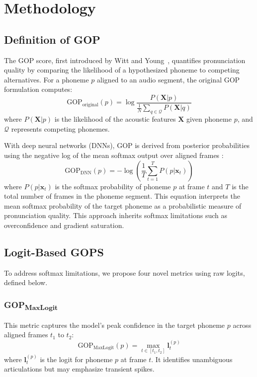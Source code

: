 \documentclass{Interspeech}
\begin{document}
\section{Methodology}
\subsection{Definition of GOP}

The GOP score, first introduced by Witt and Young~\cite{witt2000use}, quantifies pronunciation quality by comparing the likelihood of a hypothesized phoneme to competing alternatives. For a phoneme \( p \) aligned to an audio segment, the original GOP formulation computes:
\begin{equation}
    \text{GOP}_{\text{original}}(p) = \log \frac{P(\mathbf{X} | p)}{ \frac{1}{N} \sum_{q \in \mathcal{Q}} P(\mathbf{X} | q) }
    \label{eq:gop_original}
\end{equation}
where \( P(\mathbf{X} | p) \) is the likelihood of the acoustic features \( \mathbf{X} \) given phoneme \( p \), and \( \mathcal{Q} \) represents competing phonemes.

With deep neural networks (DNNs), GOP is derived from posterior probabilities using the negative log of the mean softmax output over aligned frames \cite{hu2013new}:
\begin{equation}
    \text{GOP}_{\text{DNN}}(p) = -\log \left( \frac{1}{T} \sum_{t=1}^T P(p | \mathbf{x}_t) \right)
    \label{eq:gop_dnn}
\end{equation}
where \( P(p | \mathbf{x}_t) \) is the softmax probability of phoneme \( p \) at frame \( t \) and $T$ is the total number of frames in the phoneme segment.  This equation interprets the mean softmax probability of the target phoneme as a probabilistic measure of pronunciation quality. This approach inherits softmax limitations such as overconfidence and gradient saturation.

\subsection{Logit-Based GOPS}
To address softmax limitations, we propose four novel metrics using raw logits, defined below.

\subsubsection{GOP\textsubscript{MaxLogit}}
This metric captures the model's peak confidence in the target phoneme \( p \) across aligned frames \( t_1 \) to \( t_2 \):
\begin{equation}
    \text{GOP}_{\text{MaxLogit}}(p) = \max_{t \in [t_1, t_2]} \mathbf{l}_t^{(p)}
    \label{eq:gop_maxlogit}
\end{equation}
where \( \mathbf{l}_t^{(p)} \) is the logit for phoneme \( p \) at frame \( t \). It identifies unambiguous articulations but may emphasize transient spikes.
\end{document}
